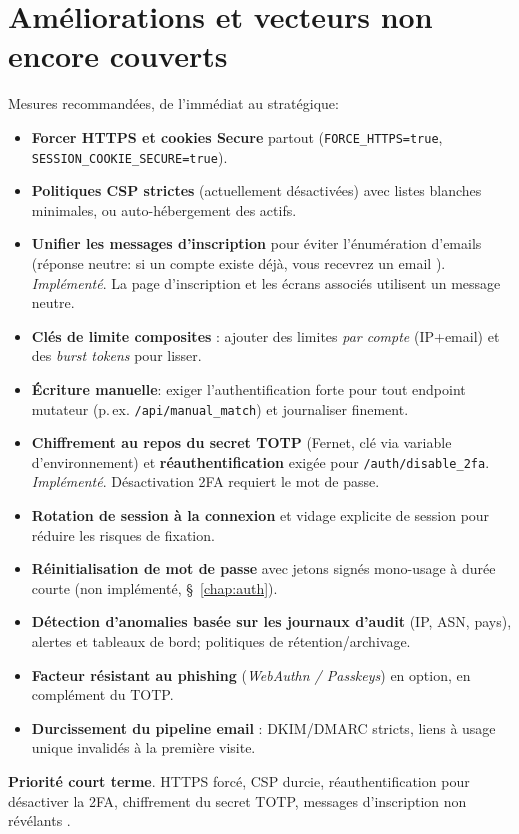 \section{Améliorations et vecteurs non encore couverts}\label{sec:improve}
\noindent Mesures recommandées, de l'immédiat au stratégique:
\begin{itemize}
  \item \textbf{Forcer HTTPS et cookies Secure} partout (\texttt{FORCE\_HTTPS=true}, \texttt{SESSION\_COOKIE\_SECURE=true}).
  \item \textbf{Politiques CSP strictes} (actuellement désactivées) avec listes blanches minimales, ou auto-hébergement des actifs.
  \item \textbf{Unifier les messages d'inscription} pour éviter l'énumération d'emails (réponse neutre: \og si un compte existe déjà, vous recevrez un email \fg{}). \textit{Implémenté}. La page d'inscription et les écrans associés utilisent un message neutre.
  \item \textbf{Clés de limite composites} : ajouter des limites \emph{par compte} (IP+email) et des \emph{burst tokens} pour lisser.
  \item \textbf{Écriture manuelle}: exiger l'authentification forte pour tout endpoint mutateur (p.\,ex. \texttt{/api/manual\_match}) et journaliser finement.
  \item \textbf{Chiffrement au repos du secret TOTP} (Fernet, clé via variable d'environnement) et \textbf{réauthentification} exigée pour \texttt{/auth/disable\_2fa}. \textit{Implémenté}. Désactivation 2FA requiert le mot de passe.
  \item \textbf{Rotation de session à la connexion} et vidage explicite de session pour réduire les risques de fixation.
  \item \textbf{Réinitialisation de mot de passe} avec jetons signés mono-usage à durée courte (non implémenté, \S~\ref{chap:auth}).
  \item \textbf{Détection d'anomalies basée sur les journaux d'audit} (IP, ASN, pays), alertes et tableaux de bord; politiques de rétention/archivage.
  \item \textbf{Facteur résistant au phishing} (\emph{WebAuthn / Passkeys}) en option, en complément du TOTP.
  \item \textbf{Durcissement du pipeline email} : DKIM/DMARC stricts, liens à usage unique invalidés à la première visite.
\end{itemize}

\vspace{0.5em}
\noindent \textbf{Priorité court terme}. HTTPS forcé, CSP durcie, réauthentification pour désactiver la 2FA, chiffrement du secret TOTP, messages d'inscription non \og révélants \fg{}.

